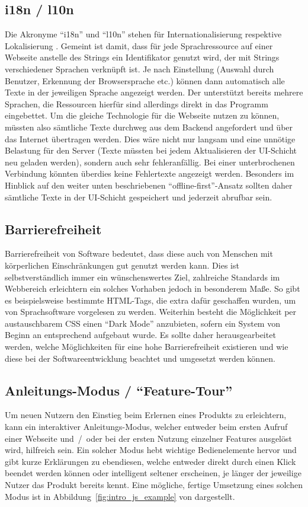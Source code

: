 \subsection{i18n / l10n}
Die Akronyme ``i18n'' und ``l10n'' stehen für Internationalisierung respektive Lokalisierung \parencite{i18n_i10n_ishida_w3c_miller_boeing_2018}. Gemeint ist damit, dass für jede Sprachressource auf einer Webseite anstelle des Strings ein Identifikator genutzt wird, der mit Strings verschiedener Sprachen verknüpft ist. Je nach Einstellung (Auswahl durch Benutzer, Erkennung der Browsersprache etc.) können dann automatisch alle Texte in der jeweiligen Sprache angezeigt werden. Der  unterstützt bereits mehrere Sprachen, die Ressourcen hierfür sind allerdings direkt in das Programm eingebettet. Um die gleiche Technologie für die Webseite nutzen zu können, müssten also sämtliche Texte durchweg aus dem Backend angefordert und über das Internet übertragen werden. Dies wäre nicht nur langsam und eine unnötige Belastung für den Server (Texte müssten bei jedem Aktualisieren der UI-Schicht neu geladen werden), sondern auch sehr fehleranfällig. Bei einer unterbrochenen Verbindung könnten überdies keine Fehlertexte angezeigt werden. Besonders im Hinblick auf den weiter unten beschriebenen ``offline-first''-Ansatz sollten daher sämtliche Texte in der UI-Schicht gespeichert und jederzeit abrufbar sein.

\subsection{Barrierefreiheit}
Barrierefreiheit von Software bedeutet, dass diese auch von Menschen mit körperlichen Einschränkungen gut genutzt werden kann. Dies ist selbstverständlich immer ein wünschenswertes Ziel, zahlreiche Standards im Webbereich erleichtern ein solches Vorhaben jedoch in besonderem Maße. So gibt es beispielsweise bestimmte HTML-Tags, die extra dafür geschaffen wurden, um von Sprachsoftware vorgelesen zu werden. Weiterhin besteht die Möglichkeit per austauschbarem CSS einen ``Dark Mode'' anzubieten, sofern ein System von Beginn an entsprechend aufgebaut wurde.
Es sollte daher herausgearbeitet werden, welche Möglichkeiten für eine hohe Barrierefreiheit existieren und wie diese bei der Softwareentwicklung beachtet und umgesetzt werden können.

\subsection{Anleitungs-Modus / ``Feature-Tour''}
 Um neuen Nutzern den Einstieg beim Erlernen eines Produkts zu erleichtern, kann ein interaktiver Anleitungs-Modus, welcher entweder beim ersten Aufruf einer Webseite und~/~oder bei der ersten Nutzung einzelner Features ausgelöst wird, hilfreich sein. Ein solcher Modus hebt wichtige Bedienelemente hervor und gibt kurze Erklärungen zu ebendiesen, welche entweder direkt durch einen Klick beendet werden können oder intelligent seltener erscheinen, je länger der jeweilige Nutzer das Produkt bereits kennt. Eine mögliche, fertige Umsetzung eines solchen Modus ist in Abbildung~\ref{fig:intro_js_example} von  dargestellt.

